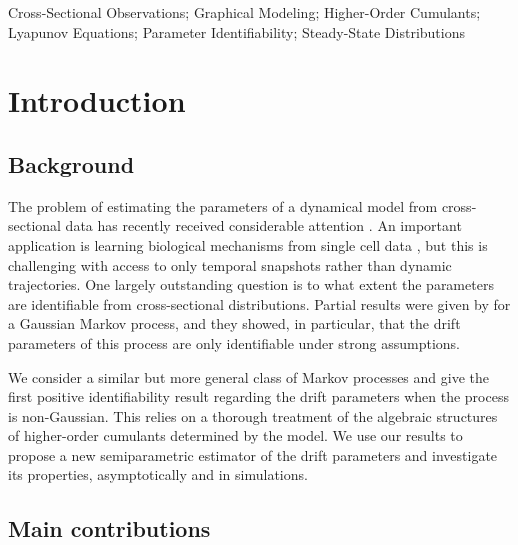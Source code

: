 \documentclass{biometrika}
\begin{document}
\begin{keywords}
 Cross-Sectional Observations; Graphical Modeling; Higher-Order Cumulants; Lyapunov Equations; Parameter Identifiability; Steady-State Distributions
\end{keywords}

\thispagestyle{empty}

\section{Introduction}

\subsection{Background}

The problem of estimating the parameters of a dynamical model from cross-sectional 
data has recently received considerable attention \citep{varando20a, Lorch:2024, guan2024identifyingdriftdiffusioncausal, bleile_efficient_2026}. An
important application is learning biological mechanisms from single cell data \citep{Wang:2023aa, Rohbeck:2024, lorch_latent_2026}, but this is challenging
with access to only temporal snapshots rather than dynamic trajectories. 
One largely outstanding question is to what extent the parameters are identifiable
from cross-sectional distributions. Partial results were given by 
\cite{Dettling:2023} for a Gaussian Markov process, and they showed, in particular, 
that the drift parameters of this process are only identifiable under strong assumptions. 

We consider a similar but more general class of Markov processes and 
give the first positive identifiability result regarding the drift parameters 
when the process is non-Gaussian. This relies on a thorough treatment of
the algebraic structures of higher-order cumulants determined by the model. 
We use our results to propose a new semiparametric estimator of 
the drift parameters and investigate its properties, asymptotically and
 in simulations.



\subsection{Main contributions}
\end{document}
